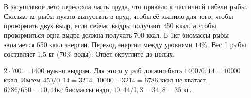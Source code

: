 
В засушливое лето пересохла часть пруда, что привело к частичной гибели
рыбы. Сколько кг рыбы нужно выпустить в пруд, чтобы её хватило для того, чтобы
прокормить двух выдр, если сейчас выдры получают 450 ккал, а чтобы прокормиться
одна выдра должна получать 700 ккал. В 1кг биомассы рыбы запасается 650 ккал
энергии. Переход энергии между уровнями $14\%$. 
Вес 1 рыбы составляет 1,5 кг ($70\%$ воды). Ответ округлите до целых.

\solutionSection

$2 \cdot 700=1400$ нужно выдрам. Для этого у рыб должно быть $1400/0,14=10000$ ккал. Имеем $450/0,14=3214$. $10000-3214=6786$ ккал не хватает. \linebreak $6786/650 = 10,44$кг биомассы надо, 
$10,44/0,3=34,8=35$ кг.

